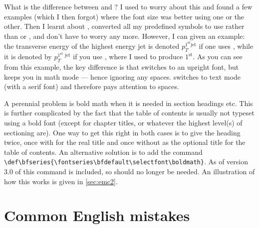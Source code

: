 What is the difference between  and
? I used to worry about this and found a
few examples (which I then forgot) where the font size was better
using one or the other. Then I learnt about ,
converted all my predefined symbols to use  rather than
 or , and don't have to worry any
more. However, I can given an example: the transverse energy of the
highest energy jet is denoted $p_{T}^{\mathrm{1^{\text{st}} jet}}$ if
one uses , while it is denoted by
$p_{T}^{\textrm{1$^{\text{st}}$ jet}}$ if you use ,
where I used  to produce $1^{\text{st}}$.  As you can see
from this example, the key difference is that  switches
to an upright font, but keeps you in math mode --- hence ignoring any
spaces.  switches to text mode (with a serif font) and
therefore pays attention to spaces.

A perennial problem is bold math when it is needed in
section headings etc. This is further complicated by the fact that the
table of contents is usually not typeset using a bold font (except for
chapter titles, or whatever the highest level(s) of sectioning are). %
One way to get this right in both cases is to give the
heading twice, once with  for the real title and once
without as the optional title for the table of contents.
An alternative solution is to add the command\\
\verb|\def\bfseries{\fontseries\bfdefault\selectfont\boldmath}|.
As of version 3.0 of  this command is included,
so  should no longer be needed.
An illustration of how this works is given in \cref{sec:emc2}.


\section{Common English mistakes}%
\label{sec:tips:english}

